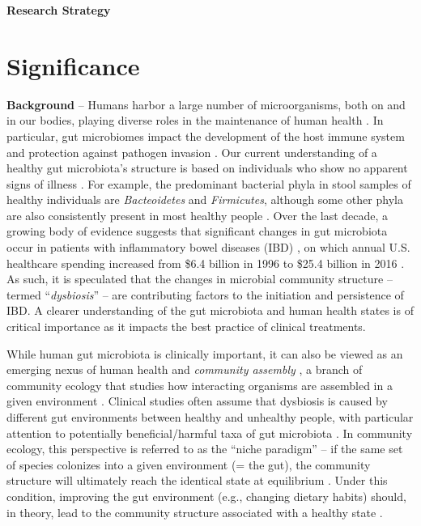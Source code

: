 \documentclass[12pt, class=article, crop=false]{standalone}
\begin{document}
\textbf{Research Strategy}

\section{Significance}

\textbf{Background} --
Humans harbor a large number of microorganisms, both on and in our bodies, playing diverse roles in the maintenance of human health \citep{fierer_animalcules_2012}.
In particular, gut microbiomes impact the development of the host immune system and protection against pathogen invasion \citep{fierer_animalcules_2012, petersen_defining_2014, turroni_infant_2020}.
Our current understanding of a healthy gut microbiota's structure is based on individuals who show no apparent signs of illness \citep{petersen_defining_2014}.
For example, the predominant bacterial phyla in stool samples of healthy individuals are \textit{Bacteoidetes} and \textit{Firmicutes}, although some other phyla are also consistently present in most healthy people \citep{petersen_defining_2014}.
Over the last decade, a growing body of evidence suggests that significant changes in gut microbiota occur in patients with inflammatory bowel diseases (IBD) \citep{frank_molecular-phylogenetic_2007, karlsson_gut_2013, abrahamsson_low_2014, parracho_differences_2005}, on which annual U.S. healthcare spending increased from \$6.4 billion in 1996 to \$25.4 billion in 2016 \citep{singh_trends_2022}.
As such, it is speculated that the changes in microbial community structure -- termed ``\textit{dysbiosis}'' -- are contributing factors to the initiation and persistence of IBD.
A clearer understanding of the gut microbiota and human health states is of critical importance as it impacts the best practice of clinical treatments. 

While human gut microbiota is clinically important, it can also be viewed as an emerging nexus of human health and \textit{community assembly} \citep{costello_application_2012}, a branch of community ecology that studies how interacting organisms are assembled in a given environment \citep{fukami_historical_2015, sprockett_role_2018}.
Clinical studies often assume that dysbiosis is caused by different gut environments between healthy and unhealthy people, with particular attention to potentially beneficial/harmful taxa of gut microbiota \citep{petersen_defining_2014}.
In community ecology, this perspective is referred to as the ``niche paradigm'' -- if the same set of species colonizes into a given environment (= the gut), the community structure will ultimately reach the identical state at equilibrium \citep{chase_community_2003}.
Under this condition, improving the gut environment (e.g., changing dietary habits) should, in theory, lead to the community structure associated with a healthy state \citep{chase_community_2003, leibold_metacommunity_2004, fukami_historical_2015, hooper_how_2002, reese_thinking_2019}.
\end{document}
